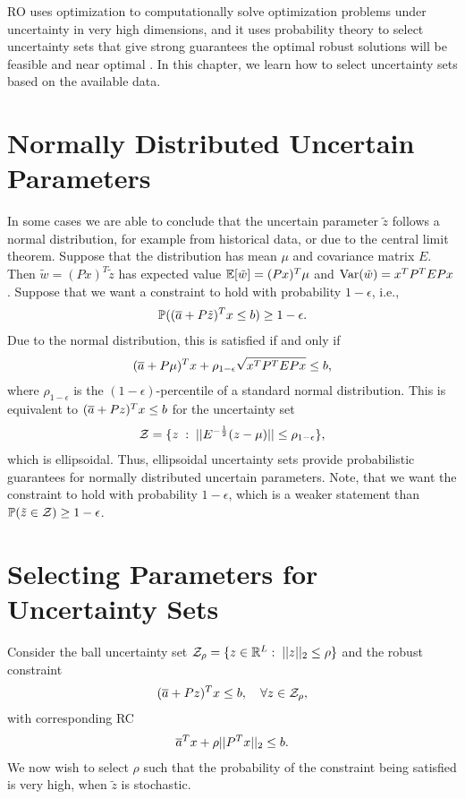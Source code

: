 RO uses optimization to computationally solve optimization problems under uncertainty in very high dimensions, and it uses probability theory to select uncertainty sets that give strong guarantees the optimal robust solutions will be feasible and near optimal . In this chapter, we learn how to select uncertainty sets based on the available data.

\section{Normally Distributed Uncertain Parameters}

In some cases we are able to conclude that the uncertain parameter $\tilde{z}$ follows a normal distribution, for example from historical data, or due to the central limit theorem. Suppose that the distribution has mean $\mu$ and covariance matrix $E$. Then $\tilde{w}=(Px)^T\tilde{z}$ has expected value $\mathbb{E} [\tilde{w}] = (Px)^T\mu$ and $\text{Var} (\tilde{w}) = x^TP^TE Px$. Suppose that we want a constraint to hold with probability $1-\epsilon$, i.e.,
\begin{align*}
\mathbb{P} ( (\overline{ a }+P\tilde{z})^Tx \leq b) \geq 1-\epsilon.
\end{align*}
Due to the normal distribution, this is satisfied if and only if
\begin{align*}
(\overline{ a }+P\mu)^Tx+\rho_{1-\epsilon}\sqrt{x^TP^TE Px}\leq b,
\end{align*}
where $\rho_{1-\epsilon}$ is the $(1-\epsilon)$-percentile of a standard normal distribution. This is equivalent to $(\overline{ a }+Pz)^Tx\leq b$ for the uncertainty set 
\begin{align*}
\mathcal{Z} = \{z\; :\;\vert\vert E^{-\frac{1}{2}}(z-\mu) \vert\vert\leq\rho_{1-\epsilon}\},
\end{align*}
which is ellipsoidal. Thus, ellipsoidal uncertainty sets provide probabilistic guarantees for normally distributed uncertain parameters. Note, that we want the constraint to hold with probability $1-\epsilon$, which is a weaker statement than $\mathbb{P}(\tilde{z}\in\mathcal{Z} )\geq 1-\epsilon$.

\section{Selecting Parameters for Uncertainty Sets}\label{p3c3sec:param}

Consider the ball uncertainty set $\mathcal{Z}_\rho = \{z\in\mathbb{R}^L:\;\vert\vert z \vert\vert_2\leq\rho\}$ and the robust constraint
\begin{align*}
(\overline{ a }+Pz)^Tx\leq b,\quad \forall z\in\mathcal{Z}_\rho,
\end{align*}
with corresponding RC
\begin{align}\label{p3c3:RCcon}
\overline{ a }^Tx + \rho\vert\vert P^Tx \vert\vert_2\leq b.
\end{align}
We now wish to select $\rho$ such that the probability of the constraint being satisfied is very high, when $\tilde{z}$ is stochastic.

